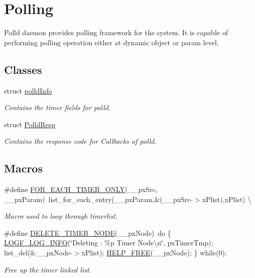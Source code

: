 \hypertarget{group__SYSFRAMEWORK__POLLD}{\section{Polling}
\label{group__SYSFRAMEWORK__POLLD}
}


Polld daemon provides polling framework for the system. It is capable of performing polling operation either at dynamic object or param level.  


\subsection*{Classes}
\begin{DoxyCompactItemize}
\item 
struct \hyperlink{structpolldInfo}{polld\-Info}
\begin{DoxyCompactList}\small\item\em Contains the timer fields for polld. \end{DoxyCompactList}\item 
struct \hyperlink{structPolldResp}{Polld\-Resp}
\begin{DoxyCompactList}\small\item\em Contains the response code for Callbacks of polld. \end{DoxyCompactList}\end{DoxyCompactItemize}
\subsection*{Macros}
\begin{DoxyCompactItemize}
\item 
\#define \hyperlink{group__SYSFRAMEWORK__POLLD_gac79d24ad3b52565290d3fbd22a47498f}{F\-O\-R\-\_\-\-E\-A\-C\-H\-\_\-\-T\-I\-M\-E\-R\-\_\-\-O\-N\-L\-Y}(\-\_\-\-\_\-px\-Src, \-\_\-\-\_\-px\-Param)~list\-\_\-for\-\_\-each\-\_\-entry(\-\_\-\-\_\-px\-Param,\&(\-\_\-\-\_\-px\-Src-\/$>$x\-Plist),x\-Plist) \textbackslash{}
\begin{DoxyCompactList}\small\item\em Macro used to loop through timerlist. \end{DoxyCompactList}\item 
\#define \hyperlink{group__SYSFRAMEWORK__POLLD_ga8d9ee84002519619a100089e8bd1a3ad}{D\-E\-L\-E\-T\-E\-\_\-\-T\-I\-M\-E\-R\-\_\-\-N\-O\-D\-E}(\-\_\-\-\_\-px\-Node)~do \{ \hyperlink{group__SYSFRAMEWORK__LOG_ga8ce0b241ee6ed787655fc6c683610cfa}{L\-O\-G\-F\-\_\-\-L\-O\-G\-\_\-\-I\-N\-F\-O}(\char`\"{}Deleting \-: \%p Timer Node\textbackslash{}n\char`\"{}, px\-Timer\-Tmp); list\-\_\-del(\&\-\_\-\-\_\-px\-Node-\/$>$x\-Plist); \hyperlink{group__LIBHELP_gad8118b0746b34f72d8b9a150290716e5}{H\-E\-L\-P\-\_\-\-F\-R\-E\-E}(\-\_\-\-\_\-px\-Node); \} while(0);
\begin{DoxyCompactList}\small\item\em Free up the timer linked list. \end{DoxyCompactList}\end{DoxyCompactItemize}
